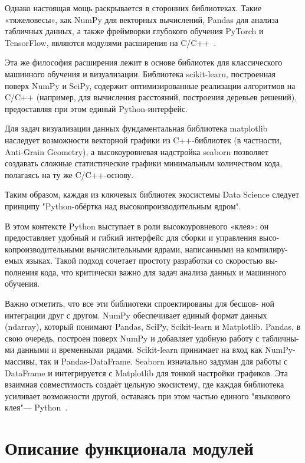 \documentclass[pract]{SCWorks}
\begin{document}
Однако настоящая мощь раскрывается в сторонних библиотеках. Такие «тяжеловесы», как NumPy для векторных вычислений, 
Pandas для анализа табличных данных, а также фреймворки глубокого обучения PyTorch и TensorFlow, являются модулями 
расширения на C/C++~\cite{numpy-docs,pandas-docs}.

Эта же философия расширения лежит в основе библиотек для классического машинного обучения и визуализации. 
Библиотека scikit-learn, построенная поверх NumPy и SciPy, содержит оптимизированные реализации алгоритмов 
на C/C++ (например, для вычисления расстояний, построения деревьев решений), предоставляя при этом единый 
Python-интерфейс. 

Для задач визуализации данных фундаментальная библиотека matplotlib наследует возможности векторной графики 
из C++-библиотек (в частности, Anti-Grain Geometry), а высокоуровневая надстройка seaborn позволяет создавать 
сложные статистические графики минимальным количеством кода, полагаясь на ту же C/C++-основу. 

Таким образом, каждая из ключевых библиотек экосистемы Data Science следует принципу 
"Python-обёртка над высокопроизводительным ядром".

В этом контексте Python выступает в роли высокоуровневого «клея»: он
предоставляет удобный и гибкий интерфейс для сборки и управления высо-
копроизводительными вычислительными ядрами, написанными на компилиру-
емых языках. Такой подход сочетает простоту разработки со скоростью вы-
полнения кода, что критически важно для задач анализа данных и машинного
обучения.

Важно отметить, что все эти библиотеки спроектированы для бесшов-
ной интеграции друг с другом. NumPy обеспечивает единый формат данных
(ndarray), который понимают Pandas, SciPy, Scikit-learn и Matplotlib. Pandas, в
свою очередь, построен поверх NumPy и добавляет удобную работу с табличны-
ми данными и временными рядами. Scikit-learn принимает на вход как NumPy-
массивы, так и Pandas-DataFrame. Seaborn изначально задуман для работы с
DataFrame и интегрируется с Matplotlib для тонкой настройки графиков. Эта
взаимная совместимость создаёт цельную экосистему, где каждая библиотека
усиливает возможности другой, оставаясь при этом частью единого "языкового
клея"— Python~\cite{vasiliev}.

\section{Описание функционала модулей}
\end{document}
